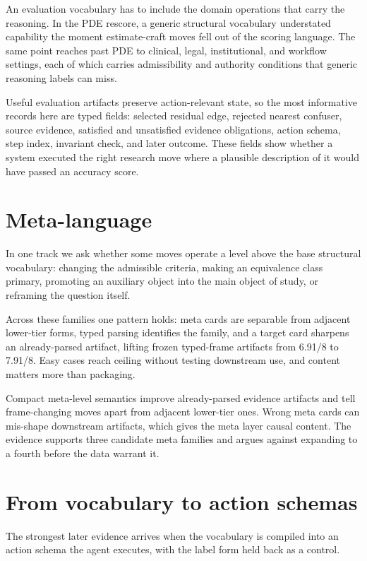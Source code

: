 \documentclass[11pt]{article}
\begin{document}
An evaluation vocabulary has to include the domain operations that carry the
reasoning. In the PDE rescore, a generic structural vocabulary understated
capability the moment estimate-craft moves fell out of the scoring language. The
same point reaches past PDE to clinical, legal, institutional, and workflow
settings, each of which carries admissibility and authority conditions that
generic reasoning labels can miss.

Useful evaluation artifacts preserve action-relevant state, so the most
informative records here are typed fields: selected residual edge, rejected
nearest confuser, source evidence, satisfied and unsatisfied evidence
obligations, action schema, step index, invariant check, and later outcome. These
fields show whether a system executed the right research move where a plausible
description of it would have passed an accuracy score.

\section{Meta-language}

In one track we ask whether some moves operate a level above the base structural
vocabulary: changing the admissible criteria, making an equivalence class primary,
promoting an auxiliary object into the main object of study, or reframing the
question itself.

Across these families one pattern holds: meta cards are separable from
adjacent lower-tier forms, typed parsing identifies the family, and a
target card sharpens an already-parsed artifact, lifting frozen
typed-frame artifacts from 6.91/8 to 7.91/8. Easy cases reach ceiling
without testing downstream use, and content matters more than packaging.

Compact meta-level semantics improve already-parsed evidence artifacts and tell
frame-changing moves apart from adjacent lower-tier ones. Wrong meta cards can
mis-shape downstream artifacts, which gives the meta layer causal content. The
evidence supports three candidate meta families and argues against expanding to a
fourth before the data warrant it.

\section{From vocabulary to action schemas}

The strongest later evidence arrives when the vocabulary is compiled into an
action schema the agent executes, with the label form held back as a control.
\end{document}
